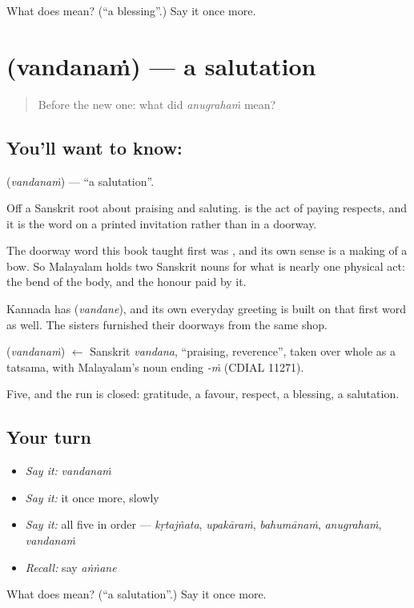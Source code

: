 \begin{tcolorbox}[breakable,colback=teal!4,colframe=teal!35!black,title={Before you move on}]
What does  mean? (\textquotedblleft{}a blessing\textquotedblright{}.) Say it once more.
\end{tcolorbox}
\section[\texorpdfstring{\ml{വന്ദനം} (vandanaṁ)}{വന്ദനം (vandanaṁ)}]{ (vandanaṁ) — a salutation}

\label{lesson:ML-C51-salutation}



\begin{quote}
Before the new one: what did \emph{anugrahaṁ} mean?
\end{quote}

\subsection*{You'll want to know: }
\textbf{} (\emph{vandanaṁ}) — \textquotedblleft{}a salutation\textquotedblright{}.

Off a Sanskrit root about praising and saluting.  is the act of paying respects, and it is the word on a printed invitation rather than in a doorway.

The doorway word this book taught first was , and its own sense is a making of a bow. So Malayalam holds two Sanskrit nouns for what is nearly one physical act: the bend of the body, and the honour paid by it.

Kannada has  (\emph{vandane}), and its own everyday greeting is built on that first word as well. The sisters furnished their doorways from the same shop.

\begin{cousinweb}
\textbf{} (\emph{vandanaṁ}) $\leftarrow$ Sanskrit \emph{vandana}, \textquotedblleft{}praising, reverence\textquotedblright{}, taken over whole as a tatsama, with Malayalam's noun ending \emph{-ṁ} (CDIAL 11271).
\end{cousinweb}

\begin{grammarlens}[title={What you've built}]
Five, and the run is closed: gratitude, a favour, respect, a blessing, a salutation.
\end{grammarlens}

\subsection*{Your turn}
\begin{itemize}
\raggedright
  \item \emph{Say it:} \emph{vandanaṁ}
  \item \emph{Say it:} it once more, slowly
  \item \emph{Say it:} all five in order — \emph{kṛtajñata}, \emph{upakāraṁ}, \emph{bahumānaṁ}, \emph{anugrahaṁ}, \emph{vandanaṁ}
  \item \emph{Recall:} say \emph{aṅṅane}
\end{itemize}

\begin{tcolorbox}[breakable,colback=teal!4,colframe=teal!35!black,title={Before you move on}]
What does  mean? (\textquotedblleft{}a salutation\textquotedblright{}.) Say it once more.
\end{tcolorbox}
